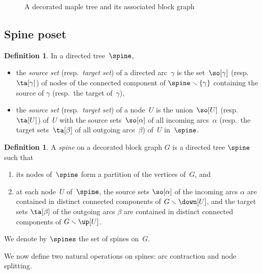 \documentclass{amsart}
\theoremstyle{definition}
\newtheorem{definition}[theorem]{Definition}
\newcommand{\ssm}{\smallsetminus} %
\newcommand{\darkblue}{\color{darkblue}} %
\newcommand{\defn}[1]{\textsl{\darkblue #1}} %
\begin{document}
\begin{figure}
{}
\caption{A decorated maple tree and its associated block graph}
\label{fig:mapleBlock}
\end{figure} 


\subsection{Spine poset}

\begin{definition}
  In a directed tree~$\spine$, 
  \begin{itemize}
    \item the \defn{source set} (resp.~\defn{target set}) of a directed arc~$\gamma$ is the set~$\so[\gamma]$ (resp.~$\ta[\gamma]$) of nodes of the connected component of $\spine \ssm \{\gamma\}$ containing the source of $\gamma$ (resp.~the target of~$\gamma$),
    \item the \defn{source set} (resp.~\defn{target set}) of a node~$U$ is the union~$\so[U]$ (resp.~$\ta[U]$) of~$U$ with the source sets~$\so[\alpha]$ of all incoming arcs~$\alpha$ (resp.~the target sets~$\ta[\beta]$ of all outgoing arcs~$\beta$) of~$U$ in~$\spine$.
  \end{itemize}
\end{definition}

\begin{definition}
  \label{def:spine}
  A \defn{spine} on a decorated block graph $G$ is a directed tree $\spine$ such that
  \begin{enumerate}
    \item its nodes of~$\spine$ form a partition of the vertices of~$G$, and 
    \item at each node~$U$ of~$\spine$, the source sets $\so[\alpha]$ of the incoming arcs $\alpha$ are contained in distinct connected components of $G \ssm \down[U]$, and the target sets $\ta[\beta]$ of the outgoing arcs $\beta$ are contained in distinct connected components of $G \ssm \up[U]$.
  \end{enumerate}
  We denote by $\spines$ the set of spines on~$G$.
\end{definition}

We now define two natural operations on spines: arc contraction and node splitting.
\end{document}
